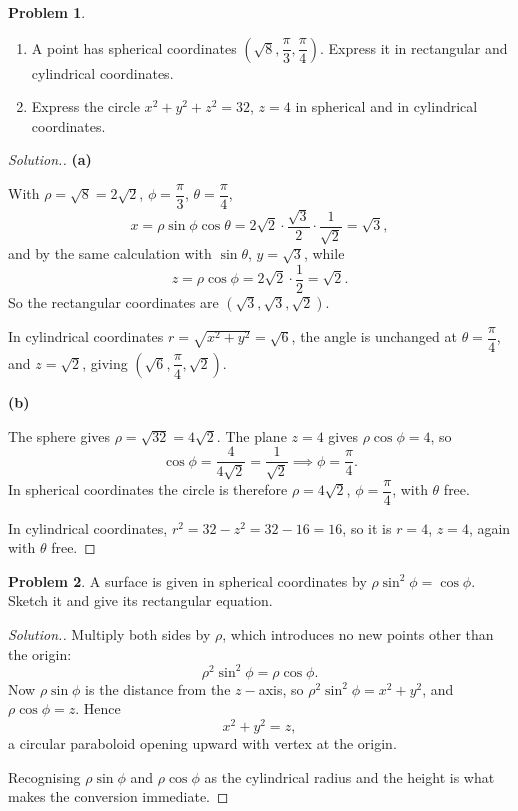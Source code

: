 \documentclass[11pt,a4paper]{article}
\theoremstyle{definition}
\newtheorem{problemx}{Problem}[subsection]
\newenvironment{problem}{\begin{problemx}}{\end{problemx}}
\newenvironment{solution}
  {\renewcommand{\qedsymbol}{}\begin{proof}[\textit{Solution}.]}
  {\end{proof}}
\newcommand{\subhead}[1]{%
  \par\medskip\noindent\textbf{#1}\par\nobreak\smallskip}
\begin{document}
\begin{problem}
\begin{enumerate}
\item[(a)] A point has spherical coordinates
$\left(\sqrt8, \dfrac{\pi}{3}, \dfrac{\pi}{4}\right)$. Express it in rectangular
and cylindrical coordinates.
\item[(b)] Express the circle $x^2+y^2+z^2 = 32$, $z = 4$ in spherical and in
cylindrical coordinates.
\end{enumerate}
\end{problem}
\begin{solution}
\subhead{(a)}
With $\rho = \sqrt8 = 2\sqrt2$, $\phi = \dfrac{\pi}{3}$,
$\theta = \dfrac{\pi}{4}$,
\[x = \rho\sin\phi\cos\theta = 2\sqrt2\cdot\frac{\sqrt3}{2}\cdot\frac{1}{\sqrt2}
= \sqrt3 ,\]
and by the same calculation with $\sin\theta$, $y = \sqrt3$, while
\[z = \rho\cos\phi = 2\sqrt2\cdot\frac12 = \sqrt2 .\]
So the rectangular coordinates are $(\sqrt3, \sqrt3, \sqrt2)$.

In cylindrical coordinates $r = \sqrt{x^2+y^2} = \sqrt6$, the angle is
unchanged at $\theta = \dfrac{\pi}{4}$, and $z = \sqrt2$, giving
$\left(\sqrt6, \dfrac{\pi}{4}, \sqrt2\right)$.

\subhead{(b)}
The sphere gives $\rho = \sqrt{32} = 4\sqrt2$. The plane $z=4$ gives
$\rho\cos\phi = 4$, so
\[\cos\phi = \frac{4}{4\sqrt2} = \frac{1}{\sqrt2}\implies \phi = \frac{\pi}{4}.\]
In spherical coordinates the circle is therefore
$\rho = 4\sqrt2$, $\phi = \dfrac{\pi}{4}$, with $\theta$ free.

In cylindrical coordinates, $r^2 = 32-z^2 = 32-16 = 16$, so it is
$r = 4$, $z = 4$, again with $\theta$ free.
\end{solution}

\begin{problem}
A surface is given in spherical coordinates by $\rho\sin^2\phi = \cos\phi$.
Sketch it and give its rectangular equation.
\end{problem}
\begin{solution}
Multiply both sides by $\rho$, which introduces no new points other than the
origin:
\[\rho^2\sin^2\phi = \rho\cos\phi .\]
Now $\rho\sin\phi$ is the distance from the $z-$axis, so
$\rho^2\sin^2\phi = x^2+y^2$, and $\rho\cos\phi = z$. Hence
\[x^2+y^2 = z ,\]
a circular paraboloid opening upward with vertex at the origin.

Recognising $\rho\sin\phi$ and $\rho\cos\phi$ as the cylindrical radius and the
height is what makes the conversion immediate.
\end{solution}
\end{document}
